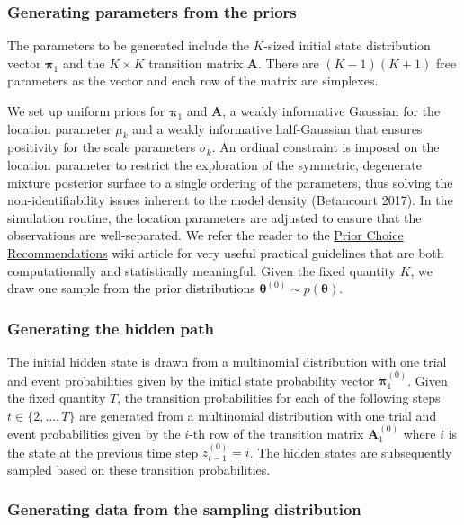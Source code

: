 \documentclass[]{article}
\newcommand{\mat}[1]{\mathbf{#1}}
\begin{document}
\subsubsection{Generating parameters from the
priors}\label{generating-parameters-from-the-priors}

The parameters to be generated include the \(K\)-sized initial state
distribution vector \(\mat{\pi}_1\) and the \(K \times K\) transition
matrix \(\mat{A}\). There are \((K-1)(K+1)\) free parameters as the
vector and each row of the matrix are simplexes.

We set up uniform priors for \(\mat{\pi}_1\) and \(\mat{A}\), a weakly
informative Gaussian for the location parameter \(\mu_k\) and a weakly
informative half-Gaussian that ensures positivity for the scale
parameters \(\sigma_k\). An ordinal constraint is imposed on the
location parameter to restrict the exploration of the symmetric,
degenerate mixture posterior surface to a single ordering of the
parameters, thus solving the non-identifiability issues inherent to the
model density (Betancourt 2017). In the simulation routine, the location
parameters are adjusted to ensure that the observations are
well-separated. We refer the reader to the
\href{https://github.com/stan-dev/stan/wiki/Prior-Choice-Recommendations}{Prior
Choice Recommendations} wiki article for very useful practical
guidelines that are both computationally and statistically meaningful.
Given the fixed quantity \(K\), we draw one sample from the prior
distributions \(\mat{\theta}^{(0)} \sim p(\mat{\theta})\).

\subsubsection{Generating the hidden
path}\label{generating-the-hidden-path}

The initial hidden state is drawn from a multinomial distribution with
one trial and event probabilities given by the initial state probability
vector \(\mat{\pi}_1^{(0)}\). Given the fixed quantity \(T\), the
transition probabilities for each of the following steps
\(t \in \{2, \dots, T\}\) are generated from a multinomial distribution
with one trial and event probabilities given by the \(i\)-th row of the
transition matrix \(\mat{A}_1^{(0)}\) where \(i\) is the state at the
previous time step \(z_{t-1}^{(0)} = i\). The hidden states are
subsequently sampled based on these transition probabilities.

\subsubsection{Generating data from the sampling
distribution}\label{generating-data-from-the-sampling-distribution}
\end{document}

